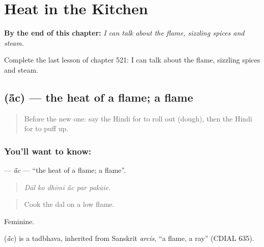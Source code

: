 
\chapter{Heat in the Kitchen}
\label{ch:hi-heat-in-the-kitchen}

\begin{chapteropening}
\textbf{By the end of this chapter:} \emph{I can talk about the flame, sizzling spices and steam.}

Complete the last lesson of chapter 521: I can talk about the flame, sizzling spices and steam.
\end{chapteropening}

\section[\texorpdfstring{\hi{आँच} (ā̃c)}{आँच (ā̃c)}]{ (ā̃c) — the heat of a flame; a flame}

\label{lesson:HI-C521-ac}



\begin{quote}
Before the new one: say the Hindi for to roll out (dough), then the Hindi for to puff up.
\end{quote}

\subsection*{You'll want to know: }
\textbf{} — \emph{ā̃c} — \textquotedblleft{}the heat of a flame; a flame\textquotedblright{}.

\begin{quote}
     
\end{quote}

\begin{quote}
\emph{Dāl ko dhīmī ā̃c par pakāie.}
\end{quote}

\begin{quote}
Cook the dal on a low flame.
\end{quote}

Feminine.

\begin{cousinweb}
\textbf{} (\emph{ā̃c}) is a tadbhava, inherited from Sanskrit \emph{arcis}, \textquotedblleft{}a flame, a ray\textquotedblright{} (CDIAL 635).
\end{cousinweb}

